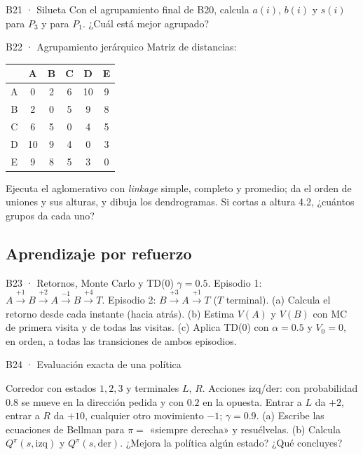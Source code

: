 \begin{ejercicio}{B21 · Silueta }
Con el agrupamiento final de B20, calcula $a(i)$, $b(i)$ y $s(i)$ para $P_3$ y para $P_1$. ¿Cuál está mejor agrupado?
\end{ejercicio}

\begin{ejercicio}{B22 · Agrupamiento jerárquico }
Matriz de distancias:
\begin{center}\small
\begin{tabular}{c|ccccc}
 & A & B & C & D & E\\\hline
A & 0 & 2 & 6 & 10 & 9\\
B & 2 & 0 & 5 & 9 & 8\\
C & 6 & 5 & 0 & 4 & 5\\
D & 10 & 9 & 4 & 0 & 3\\
E & 9 & 8 & 5 & 3 & 0
\end{tabular}
\end{center}
Ejecuta el aglomerativo con \emph{linkage} simple, completo y promedio; da el orden de uniones y sus alturas, y dibuja los
dendrogramas. Si cortas a altura 4.2, ¿cuántos grupos da cada uno?
\end{ejercicio}

\subsection{Aprendizaje por refuerzo}

\begin{ejercicio}{B23 · Retornos, Monte Carlo y TD(0) }
$\gamma=0.5$. Episodio 1: $A\xrightarrow{+1}B\xrightarrow{+2}A\xrightarrow{-1}B\xrightarrow{+4}T$. Episodio 2: $B\xrightarrow{+3}A\xrightarrow{+1}T$ ($T$ terminal).
(a) Calcula el retorno desde cada instante (hacia atrás).
(b) Estima $V(A)$ y $V(B)$ con MC de primera visita y de todas las visitas.
(c) Aplica TD(0) con $\alpha=0.5$ y $V_0=0$, en orden, a todas las transiciones de ambos episodios.
\end{ejercicio}

\begin{ejercicio}{B24 · Evaluación exacta de una política }
\begin{center}\figCorredor\end{center}
Corredor con estados $1,2,3$ y terminales $L$, $R$. Acciones izq/der: con probabilidad $0.8$ se mueve en la dirección
pedida y con $0.2$ en la opuesta. Entrar a $L$ da $+2$, entrar a $R$ da $+10$, cualquier otro movimiento $-1$; $\gamma=0.9$.
(a) Escribe las ecuaciones de Bellman para $\pi=$ «siempre derecha» y resuélvelas.
(b) Calcula $Q^\pi(s,\text{izq})$ y $Q^\pi(s,\text{der})$. ¿Mejora la política algún estado? ¿Qué concluyes?
\end{ejercicio}

